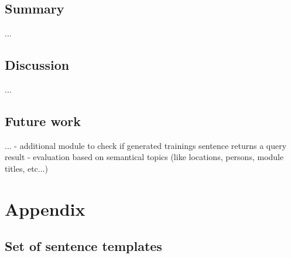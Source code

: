 \section{Summary}\label{c.conclusion.summary}
...

\section{Discussion}\label{c.conclusion.discussion}
...

\section{Future work}\label{c.conclusion.future}
...
- additional module to check if generated trainings sentence returns a query result
- evaluation based on semantical topics (like locations, persons, module titles, etc...)

\cite{mueller2015}




\appendix
\chapter{Appendix}\label{c.appendix}

\section{Set of sentence templates}\label{c.appendix.sentencetemplates}


